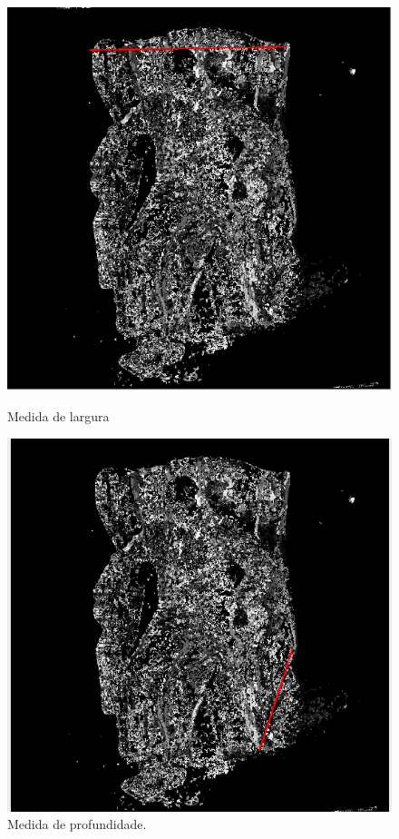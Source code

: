 \documentclass{bmvc2k}
\begin{document}
\begin{figure}[htb]
\begin{minipage}[t]{0.25\textwidth}
  \includegraphics[width=\linewidth]{figs/width.png}
  \caption{Medida de largura}
  \label{fig:width}
\end{minipage}\hfill
\begin{minipage}[t]{0.25\textwidth}
  \centering
  \includegraphics[width=\linewidth]{figs/depth.png}
  \caption{Medida de profundidade.}
  \label{fig:depth}
\end{minipage}
\end{figure}
\end{document}
